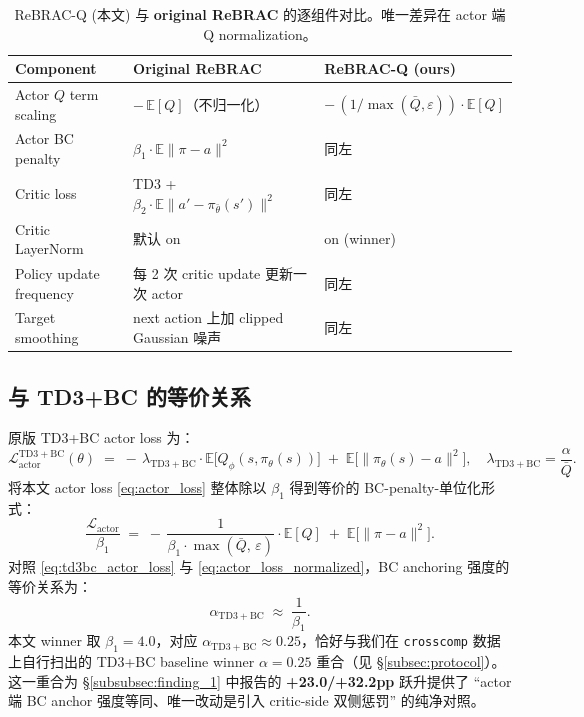 \begin{table}[t]
\centering
\small
\caption{ReBRAC-Q (本文) 与 \textbf{original ReBRAC} \citep{tarasov2023rebrac} 的逐组件对比。唯一差异在 actor 端 Q normalization。}
\label{tab:method_vs_rebrac}
\begin{tabular}{lll}
\toprule
\textbf{Component} & \textbf{Original ReBRAC} & \textbf{ReBRAC-Q (ours)} \\
\midrule
Actor $Q$ term scaling   & $-\,\mathbb{E}[Q]$（不归一化） & $-\,(1/\max(\bar{Q},\varepsilon))\cdot \mathbb{E}[Q]$ \\
Actor BC penalty         & $\beta_1 \cdot \mathbb{E}\|\pi - a\|^2$ & 同左 \\
Critic loss              & TD3 + $\beta_2 \cdot \mathbb{E}\|a' - \pi_{\bar\theta}(s')\|^2$ & 同左 \\
Critic LayerNorm         & 默认 on & on (winner) \\
Policy update frequency  & 每 2 次 critic update 更新一次 actor & 同左 \\
Target smoothing         & next action 上加 clipped Gaussian 噪声 & 同左 \\
\bottomrule
\end{tabular}
\end{table}

\subsection{与 TD3+BC 的等价关系}
\label{subsec:method_td3bc_relation}

\citet{fujimoto2021td3bc} 原版 TD3+BC actor loss 为：
\begin{equation}
\mathcal{L}_{\mathrm{actor}}^{\mathrm{TD3+BC}}(\theta)
\;=\; -\,\lambda_{\mathrm{TD3+BC}} \cdot \mathbb{E}\bigl[Q_\phi(s, \pi_\theta(s))\bigr]
\;+\; \mathbb{E}\bigl[\|\pi_\theta(s) - a\|^2\bigr],
\quad \lambda_{\mathrm{TD3+BC}} = \frac{\alpha}{\bar{Q}}.
\label{eq:td3bc_actor_loss}
\end{equation}
将本文 actor loss \eqref{eq:actor_loss} 整体除以 $\beta_1$ 得到等价的 BC-penalty-单位化形式：
\begin{equation}
\frac{\mathcal{L}_{\mathrm{actor}}}{\beta_1}
\;=\; -\,\frac{1}{\beta_1 \cdot \max(\bar{Q},\,\varepsilon)} \cdot \mathbb{E}[Q]
\;+\; \mathbb{E}\bigl[\|\pi - a\|^2\bigr].
\label{eq:actor_loss_normalized}
\end{equation}
对照 \eqref{eq:td3bc_actor_loss} 与 \eqref{eq:actor_loss_normalized}，BC anchoring 强度的等价关系为：
\begin{equation}
\alpha_{\mathrm{TD3+BC}} \;\approx\; \frac{1}{\beta_1}.
\label{eq:beta1_alpha_equiv}
\end{equation}
本文 winner 取 $\beta_1 = 4.0$，对应 $\alpha_{\mathrm{TD3+BC}} \approx 0.25$，恰好与我们在 \texttt{crosscomp} 数据上自行扫出的 TD3+BC baseline winner $\alpha = 0.25$ 重合（见 \S\ref{subsec:protocol}）。这一重合为 \S\ref{subsubsec:finding_1} 中报告的 \textbf{+23.0/+32.2pp} 跃升提供了 ``actor 端 BC anchor 强度等同、唯一改动是引入 critic-side 双侧惩罚'' 的纯净对照。

